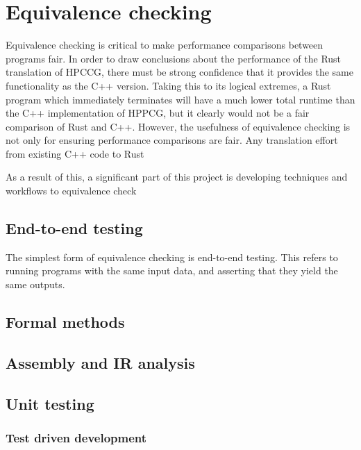 \section{Equivalence checking}
\label{sec:equivalence-checking} %

Equivalence checking is critical to make performance comparisons between programs fair. In order to draw conclusions about the performance of the Rust translation of HPCCG, there must be strong confidence that it provides the same functionality as the C++ version. Taking this to its logical extremes, a Rust program which immediately terminates will have a much lower total runtime than the C++ implementation of HPPCG, but it clearly would not be a fair comparison of Rust and C++. However, the usefulness of equivalence checking is not only for ensuring performance comparisons are fair. Any translation effort from existing C++ code to Rust 

As a result of this, a significant part of this project is developing techniques and workflows to equivalence check

\subsection{End-to-end testing}
\label{sec:equivalence-end-to-end}

The simplest form of equivalence checking is end-to-end testing. This refers to running programs with the same input data, and asserting that they yield the same outputs.

\subsection{Formal methods}
\label{sec:equivalence-end-to-end}

\subsection{Assembly and IR analysis}
\label{sec:equivalence-end-to-end}

\subsection{Unit testing}
\label{sec:equivalence-unit-testing}

\subsubsection{Test driven development}
\label{sec:equivalence-tdd}

